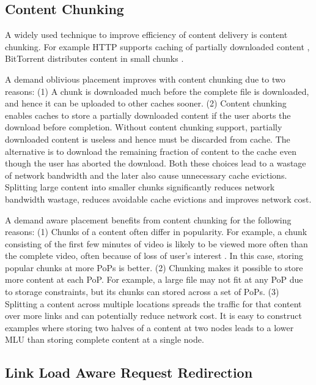 

\eat
{


\subsection{Content Chunking}

A widely used technique to improve efficiency of content delivery is content chunking. For example HTTP supports caching of partially downloaded content \cite{rfc2616}, BitTorrent distributes content in small chunks \cite{bittorrentprotocol}.

A demand oblivious placement improves with content chunking due to two reasons: (1) A chunk is downloaded much before the complete file is downloaded, and hence it can be uploaded to other caches sooner. (2) Content chunking enables caches to store a partially downloaded content if the user aborts the download before completion. Without content chunking support, partially downloaded content is useless and hence must be discarded from cache. The alternative is to download the remaining fraction of content to the cache even though the user has aborted the download. Both these choices lead to a wastage of network bandwidth and the later also cause unnecessary cache evictions.  Splitting large content into smaller chunks significantly reduces network bandwidth wastage, reduces avoidable cache evictions and improves network cost.

A demand aware placement benefits from content chunking for the following reasons: (1) Chunks of a content often differ in popularity.  For example, a chunk consisting of the first few minutes of video is likely to be viewed more often than the complete video, often because of loss of user's interest \cite{youtubestudy}. In this case, storing popular chunks at more PoPs is better.  (2) Chunking makes it possible to store more content at each PoP. For example, a large file may not  fit at any PoP due to storage constraints,  but its chunks can stored across a set of PoPs. 
(3) Splitting a content across multiple locations spreads the traffic for that content over more links and can potentially reduce network cost. It is easy to construct examples where storing two halves of a content at two nodes leads to a lower MLU than storing complete content at a single node.


\subsection{Link Load Aware Request Redirection}

}
